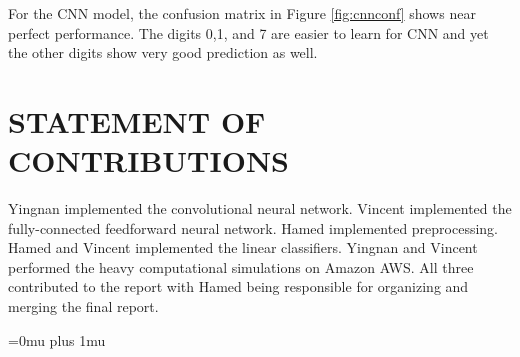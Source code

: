\documentclass[letterpaper, 10 pt, conference]{ieeeconf}  %
\begin{document}
For the CNN model, the confusion matrix in Figure \ref{fig:cnnconf} shows near perfect performance. The digits 0,1, and 7 are easier to learn for CNN and yet the other digits show very good prediction as well.


\addtolength{\textheight}{-12cm}   %






\section*{STATEMENT OF CONTRIBUTIONS}
Yingnan implemented the convolutional neural network.
Vincent implemented the fully-connected feedforward neural
network. Hamed implemented preprocessing. Hamed and Vincent implemented the linear classifiers. Yingnan and Vincent performed the heavy computational simulations on Amazon AWS. All three contributed to the report with Hamed being responsible for organizing and merging the final report.






\Urlmuskip=0mu plus 1mu\relax


%
\end{document}
